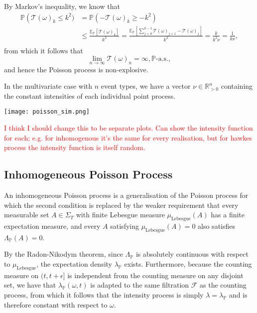 \documentclass[honours,12pt]{unswthesis}
\numberwithin{equation}{section}
\begin{document}
By Markov's inequality, we know that
\begin{equation*}
	\begin{align}
		\mathbb{P}\left(\mathcal{T}(\omega)_k\leq k^2) &= \mathbb{P}\left(-\mathcal{T}(\omega)_k\geq -k^2\right) \\
		&\leq \frac{\mathbb{E}_\mathbb{P}[\mathcal{T}(\omega)_k]}{k^2} = \frac{\mathbb{E}_\mathbb{P}[\sum_{j=0}^{k-1} \mathcal{T}(\omega)_{j+1}-\mathcal{T}(\omega)_j]}{k^2} = \frac{k}{k^2\nu} = \frac{1}{k\nu}, \\
	\end{align}
\end{equation*}
from which it follows that
$$\lim_{n\to\infty} \mathcal{T}(\omega)_n = \infty, \mathbb{P}\text{-a.s.},$$
and hence the Poisson process is non-explosive.

In the multivariate case with $n$ event types, we have a vector $\nu\in\mathbb{R}_{>0}^n$ containing the constant intensities of each individual point process.

\texttt{[image: poisson\_sim.png]}

\textcolor{red}{I think I should change this to be separate plots. Can show the intensity function for each; e.g. for inhomogenous it's the same for every realisation, but for hawkes process the intensity function is itself random.}

\subsection{Inhomogeneous Poisson Process}
An inhomogeneous Poisson process is a generalisation of the Poisson process for which the second condition is replaced by the weaker requirement that every measurable set $A\in\Sigma_T$ with finite Lebesgue measure $\mu_{\mathrm{Lebesgue}}(A)$ has a finite expectation measure, and every $A$ satisfying $\mu_\mathrm{Lebesgue}(A)=0$ also satisfies $\Lambda_\mathbb{P}(A)=0$.

By the Radon-Nikodym theorem, since $\Lambda_\mathbb{P}$ is absolutely continuous with respect to $\mu_\mathrm{Lebesgue}$, the expectation density $\lambda_\mathbb{P}$ exists. Furthermore, because the counting measure on $(t,t+\epsilon]$ is independent from the counting measure on any disjoint set, we have that $\lambda_\mathbb{P}(\omega,t)$ is adapted to the same filtration $\mathcal{F}$ as the counting process, from which it follows that the intensity process is simply $\lambda=\lambda_\mathbb{P}$ and is therefore constant with respect to $\omega$.
\end{document}
